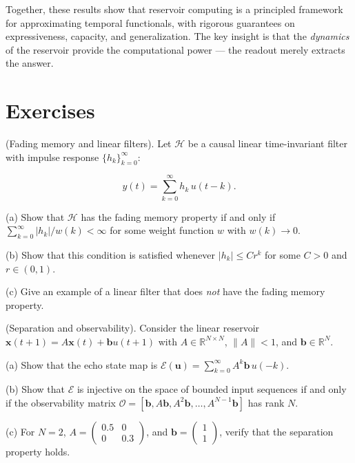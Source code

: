 Together, these results show that reservoir computing is a principled framework for
approximating temporal functionals, with rigorous guarantees on expressiveness,
capacity, and generalization. The key insight is that the \textit{dynamics} of the reservoir
provide the computational power --- the readout merely extracts the answer.


\bigskip


\section*{Exercises}

\begin{exercise}
(Fading memory and linear filters). Let $\mathcal{H}$ be a
causal linear time-invariant filter with impulse response $\{h_k\}_{k=0}^{\infty}$:

\[
y(t) = \sum_{k=0}^{\infty} h_k\, u(t-k).
\]

(a) Show that $\mathcal{H}$ has the fading memory property if and only if $\sum_{k=0}^{\infty} |h_k| / w(k) < \infty$ for some weight function $w$ with $w(k) \to 0$.

(b) Show that this condition is satisfied whenever $|h_k| \leq C r^k$ for some $C > 0$ and $r \in (0,1)$.

(c) Give an example of a linear filter that does \textit{not} have the fading memory property.
\end{exercise}


\begin{exercise}
(Separation and observability). Consider the linear reservoir
$\mathbf{x}(t+1) = A\mathbf{x}(t) + \mathbf{b} u(t+1)$ with $A \in \mathbb{R}^{N \times N}$,
$\|A\| < 1$, and $\mathbf{b} \in \mathbb{R}^N$.

(a) Show that the echo state map is $\mathcal{E}(\mathbf{u}) = \sum_{k=0}^{\infty} A^k \mathbf{b}\, u(-k)$.

(b) Show that $\mathcal{E}$ is injective on the space of bounded input sequences if
and only if the observability matrix $\mathcal{O} = [\mathbf{b}, A\mathbf{b}, A^2\mathbf{b}, \ldots, A^{N-1}\mathbf{b}]$ has rank $N$.

(c) For $N = 2$, $A = \begin{pmatrix} 0.5 & 0 \\ 0 & 0.3 \end{pmatrix}$, and
$\mathbf{b} = \begin{pmatrix} 1 \\ 1 \end{pmatrix}$, verify that the separation property
holds.
\end{exercise}


